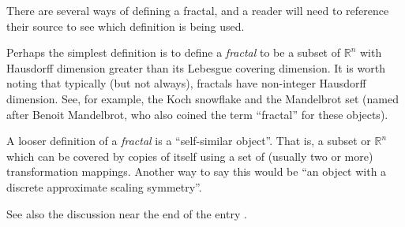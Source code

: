 \documentclass[12pt]{article}
\newcommand{\R}{\mathbb R}
\begin{document}

There are several ways of defining a fractal, and a reader will need to reference their source to see which definition is being used.  

Perhaps the simplest definition is to define a \emph{fractal} to be a subset of $\mathbb{R}^n$ with Hausdorff dimension greater than its Lebesgue covering dimension.  It is worth noting that typically (but not always), fractals have non-integer Hausdorff dimension.  See, for example, the Koch snowflake and the Mandelbrot set (named after Benoit Mandelbrot, who also coined the term ``fractal'' for these objects).

A looser definition of a \emph{fractal} is a ``self-similar object''.  That is, a subset or $\R^n$ which can be covered by copies of itself using a set of (usually two or more) transformation mappings.  Another way to say this would be ``an object with a discrete approximate scaling symmetry''. 

See also the discussion near the end of the entry .
\end{document}
